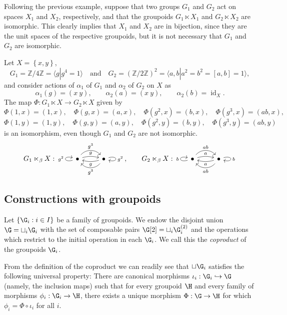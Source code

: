 \begin{example}
Following the previous example, suppose that two groups $G_1$ and $G_2$ act on spaces $X_1$ and $X_2$, respectively, and that the groupoids $G_1\ltimes X_1$ and $G_2\ltimes X_2$ are isomorphic. This clearly implies that $X_1$ and $X_2$ are in bijection, since they are the unit spaces of the respective groupoids, but it is not necessary that $G_1$ and $G_2$ are isomorphic.

Let $X=\left\{x,y\right\}$,
\[G_1=\mathbb{Z}/4\mathbb{Z}=\langle g|g^4=1\rangle\quad\text{and}\quad G_2=(\mathbb{Z}/2\mathbb{Z})^2=\langle a,b|a^2=b^2=[a,b]=1\rangle,\]
and consider actions of $\alpha_1$ of $G_1$ and $\alpha_2$ of $G_2$ on $X$ as
\[\alpha_1(g)=(x\ y),\qquad \alpha_2(a)=(x\ y),\qquad \alpha_2(b)=\operatorname{id}_X.\]
The map $\Phi:G_1\ltimes X\to G_2\ltimes X$ given by
\[\Phi(1,x)=(1,x),\quad\Phi(g,x)=(a,x),\quad\Phi(g^2,x)=(b,x),\quad\Phi(g^3,x)=(ab,x),\]
\[\Phi(1,y)=(1,y),\quad\Phi(g,y)=(a,y),\quad\Phi(g^2,y)=(b,y),\quad\Phi(g^3,y)=(ab,y)\]
is an isomorphism, even though $G_1$ and $G_2$ are not isomorphic.
\[G_1\ltimes_\beta X:\begin{tikzcd}
\bullet\arrow[loop left,"g^2"]\arrow[r,bend left=15,"g"]\arrow[r,bend left=50,"g^3"]
	&\bullet\arrow[loop right,"g^2"]\arrow[l,bend left=15,"g"]\arrow[l,bend left=50,"g^3"]
\end{tikzcd},\qquad
G_2\ltimes_\beta X:\begin{tikzcd}
\bullet\arrow[loop left,"b"]\arrow[r,bend left=15,"a"]\arrow[r,bend left=50,"ab"]
	&\bullet\arrow[loop right,"b"]\arrow[l,bend left=15,"a"]\arrow[l,bend left=50,"ab"]
\end{tikzcd}\]
\end{example}
\subsection{Constructions with groupoids}

\begin{definition}\label{definitiongroupoidcoproduct}
Let $\left\{\G_i:i\in I\right\}$ be a family of groupoids. We endow the disjoint union $\G=\sqcup_i \G_i$ with the set of composable pairs $\G[2]=\sqcup_i \G_i^{(2)}$ and the operations which restrict to the initial operation in each $\G_i$. We call this the \emph{coproduct} of the groupoids $\G_i$.
\end{definition}

From the definition of the coproduct we can readily see that $\sqcup \G_i$ satisfies the following universal property: There are canonical morphisms $\iota_i:\G_i\hookrightarrow\G$ (namely, the inclusion maps) such that for every groupoid $\H$ and every family of morphisms $\phi_i:\G_i\to\H$, there exists a unique morphism $\Phi:\G\to\H$ for which $\phi_i=\Phi\circ\iota_i$ for all $i$.

